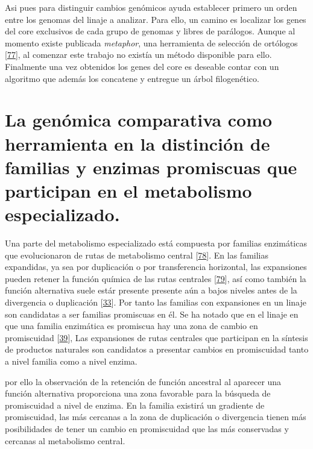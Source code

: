 \documentclass[12pt,twoside]{reedthesis}
\begin{document}
  Asi pues para distinguir cambios genómicos ayuda establecer primero un
  orden entre los genomas del linaje a analizar. Para ello, un camino es
  localizar los genes del core exclusivos de cada grupo de genomas y
  libres de parálogos. Aunque al momento existe publicada \emph{metaphor},
  una herramienta de selección de ortólogos
  {[}\protect\hyperlink{ref-van_der_veen_metaphor_2014}{77}{]}, al
  comenzar este trabajo no existía un método disponible para ello.
  Finalmente una vez obtenidos los genes del core es deseable contar con
  un algoritmo que además los concatene y entregue un árbol filogenético.
  
  \section{La genómica comparativa como herramienta en la distinción de
  familias y enzimas promiscuas que participan en el metabolismo
  especializado.}\label{la-genomica-comparativa-como-herramienta-en-la-distincion-de-familias-y-enzimas-promiscuas-que-participan-en-el-metabolismo-especializado.}
  
  Una parte del metabolismo especializado está compuesta por familias
  enzimáticas que evolucionaron de rutas de metabolismo central
  {[}\protect\hyperlink{ref-caetano-anolles_origin_metabolism_2009}{78}{]}.
  En las familias expandidas, ya sea por duplicación o por transferencia
  horizontal, las expansiones pueden retener la función química de las
  rutas centrales
  {[}\protect\hyperlink{ref-schniete_expanding_2018}{79}{]}, así como
  también la función alternativa suele estár presente presente aún a bajos
  niveles antes de la divergencia o duplicación
  {[}\protect\hyperlink{ref-soskine_mutational_2010}{33}{]}. Por tanto las
  familias con expansiones en un linaje son candidatas a ser familias
  promiscuas en él. Se ha notado que en el linaje en que una familia
  enzimática es promiscua hay una zona de cambio en promiscuidad
  {[}\protect\hyperlink{ref-noda-garcia_insights_2015}{39}{]}, Las
  expansiones de rutas centrales que participan en la síntesis de
  productos naturales son candidatos a presentar cambios en promiscuidad
  tanto a nivel familia como a nivel enzima.
  
  por ello la observación de la retención de función ancestral al aparecer
  una función alternativa proporciona una zona favorable para la búsqueda
  de promiscuidad a nivel de enzima. En la familia existirá un gradiente
  de promiscuidad, las más cercanas a la zona de duplicación o divergencia
  tienen más posibilidades de tener un cambio en promiscuidad que las más
  conservadas y cercanas al metabolismo central.
  
\end{document}
